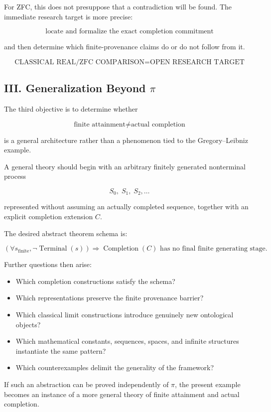 \documentclass[11pt,a4paper]{article}
\begin{document}
For ZFC, this does not presuppose that a contradiction will be found.
The immediate research target is more precise:

\[
\boxed{
\text{locate and formalize the exact completion commitment}
}
\]

and then determine which finite-provenance claims do or do not follow
from it.

\[
\boxed{
\text{CLASSICAL REAL/ZFC COMPARISON}
=
\text{OPEN RESEARCH TARGET}
}
\]

\subsection{III. Generalization Beyond \(\pi\)}

The third objective is to determine whether

\[
\text{finite attainment}
\neq
\text{actual completion}
\]

is a general architecture rather than a phenomenon tied to the
Gregory--Leibniz example.

A general theory should begin with an arbitrary finitely generated
nonterminal process

\[
S_0,\;S_1,\;S_2,\ldots
\]

represented without assuming an actually completed sequence, together
with an explicit completion extension \(C\).

The desired abstract theorem schema is:

\[
\left(
\forall s_{\mathrm{finite}},
\neg\operatorname{Terminal}(s)
\right)
\Longrightarrow
\operatorname{Completion}(C)
\text{ has no final finite generating stage}.
\]

Further questions then arise:

\begin{itemize}
\item Which completion constructions satisfy the schema?
\item Which representations preserve the finite provenance barrier?
\item Which classical limit constructions introduce genuinely new
ontological objects?
\item Which mathematical constants, sequences, spaces, and infinite
structures instantiate the same pattern?
\item Which counterexamples delimit the generality of the framework?
\end{itemize}

If such an abstraction can be proved independently of \(\pi\), the
present example becomes an instance of a more general theory of finite
attainment and actual completion.
\end{document}
